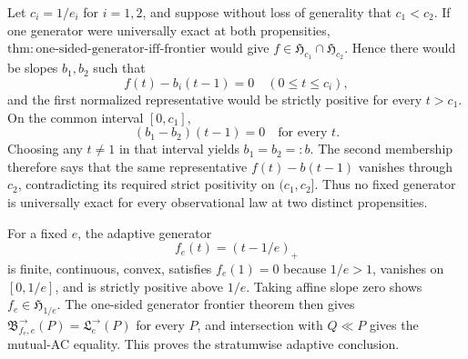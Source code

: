 Let \(c_i=1/e_i\) for \(i=1,2\), and suppose without loss of generality that \(c_1<c_2\).  If one generator were universally exact at both propensities, \(\mathrm{thm:one\text{-}sided\text{-}generator\text{-}iff\text{-}frontier}\) would give \(f\in\mathfrak H_{c_1}\cap\mathfrak H_{c_2}\).  Hence there would be slopes \(b_1,b_2\) such that
\[
 f(t)-b_i(t-1)=0\quad(0\le t\le c_i),
\]
and the first normalized representative would be strictly positive for every \(t>c_1\).  On the common interval \([0,c_1]\),
\[
 (b_1-b_2)(t-1)=0\quad\text{for every }t.
\]
Choosing any \(t\ne1\) in that interval yields \(b_1=b_2=:b\).  The second membership therefore says that the same representative \(f(t)-b(t-1)\) vanishes through \(c_2\), contradicting its required strict positivity on \((c_1,c_2]\).  Thus no fixed generator is universally exact for every observational law at two distinct propensities.

For a fixed \(e\), the adaptive generator
\[
 f_e(t)=(t-1/e)_+
\]
is finite, continuous, convex, satisfies \(f_e(1)=0\) because \(1/e>1\), vanishes on \([0,1/e]\), and is strictly positive above \(1/e\).  Taking affine slope zero shows \(f_e\in\mathfrak H_{1/e}\).  The one-sided generator frontier theorem then gives \(\mathfrak B^{\to}_{f_e,e}(P)=\mathfrak L^{\to}_e(P)\) for every \(P\), and intersection with \(Q\ll P\) gives the mutual-AC equality.  This proves the stratumwise adaptive conclusion.